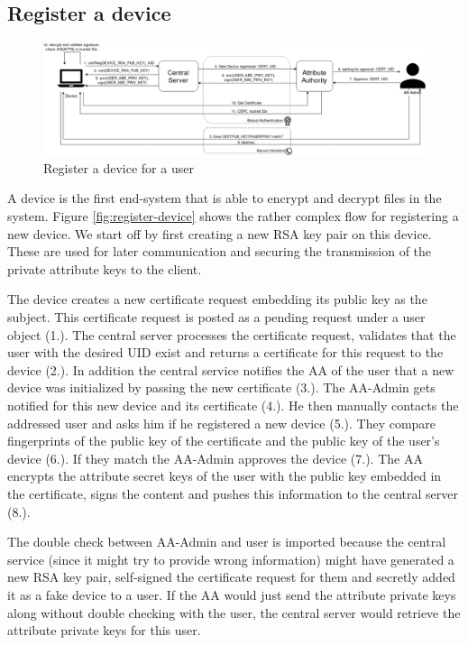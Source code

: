 \subsection{Register a device}
\begin{figure}[!h]
\centering
    \includegraphics[width=\linewidth]{img/device_register.png}
    \caption{Register a device for a user}
    \label{fig:device-register}
\end{figure}

A device is the first end-system that is able to encrypt and decrypt files in the system. Figure \ref{fig:register-device} shows the rather complex flow for registering a new device. We start off by first creating a new RSA key pair on this device. These are used for later communication and securing the transmission of the private attribute keys to the client. 

The device creates a new certificate request embedding its public key as the subject. This certificate request is posted as a pending request under a user object (1.). The central server processes the certificate request, validates that the user with the desired UID exist and returns a certificate for this request to the device (2.). In addition the central service notifies the AA of the user that a new device was initialized by passing the new certificate (3.). The AA-Admin gets notified for this new device and its certificate (4.). He then manually contacts the addressed user and asks him if he registered a new device (5.). They compare fingerprints of the public key of the certificate and the public key of the user’s device (6.). If they match the AA-Admin approves the device (7.). The AA encrypts the attribute secret keys of the user with the public key embedded in the certificate, signs the content and pushes this information to the central server (8.). 

The double check between AA-Admin and user is imported because the central service (since it might try to provide wrong information) might have generated a new RSA key pair, self-signed the certificate request for them and secretly added it as a fake device to a user. If the AA would just send the attribute private keys along without double checking with the user, the central server would retrieve the attribute private keys for this user. 

